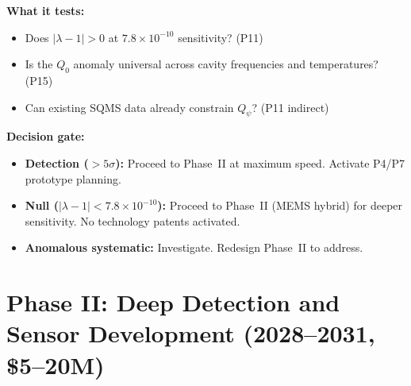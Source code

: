\documentclass[11pt]{article}
\newcommand{\ee}[1]{\times 10^{#1}}
\newcommand{\lambdaone}{|\lambda{-}1|}
\begin{document}
\begin{tcolorbox}[colback=blue!5!white, colframe=blue!60!black,
  title=\textbf{Phase I: SQMS 4-Cavity + ESS Channel B}]
\textbf{What it tests:}
\begin{itemize}[nosep]
  \item Does $\lambdaone > 0$ at $7.8\ee{-10}$ sensitivity? (P11)
  \item Is the $Q_0$ anomaly universal across cavity frequencies and
    temperatures? (P15)
  \item Can existing SQMS data already constrain $Q_\psi$? (P11 indirect)
\end{itemize}

\textbf{Decision gate:}
\begin{itemize}[nosep]
  \item \textbf{Detection ($>5\sigma$):} Proceed to Phase~II at maximum
    speed. Activate P4/P7 prototype planning.
  \item \textbf{Null ($\lambdaone < 7.8\ee{-10}$):} Proceed to Phase~II
    (MEMS hybrid) for deeper sensitivity. No technology patents activated.
  \item \textbf{Anomalous systematic:} Investigate. Redesign Phase~II
    to address.
\end{itemize}
\end{tcolorbox}

\section{Phase II: Deep Detection and Sensor Development (2028--2031, \$5--20M)}
\label{sec:phase2}
\end{document}
